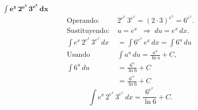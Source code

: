 $\displaystyle \mathbf{\int e^{x}\,2^{e^{x}}\,3^{e^{x}}\,dx}$
\nopagebreak
\begin{align*}
\text{Operando: } &2^{e^{x}}\,3^{e^{x}} = (2\cdot 3)^{e^{x}} = 6^{e^{x}}. \\[6pt]
\text{Sustituyendo: } &u = e^{x} \;\;\Rightarrow\; du = e^{x}\,dx. \\[6pt]
\int e^{x}\,2^{e^{x}}\,3^{e^{x}}\,dx
&= \int 6^{e^{x}}\,e^{x}\,dx = \int 6^{u}\,du \\[6pt]
\text{Usando } &\int a^{u}\,du = \frac{a^{u}}{\ln a} + C, \\[6pt]
\int 6^{u}\,du
&= \frac{6^{u}}{\ln 6} + C \\[6pt]
&= \frac{6^{e^{x}}}{\ln 6} + C
\end{align*}
\[
\boxed{\displaystyle 
\int e^{x}\,2^{e^{x}}\,3^{e^{x}}\,dx
= \frac{6^{e^{x}}}{\ln 6} + C.}
\]
